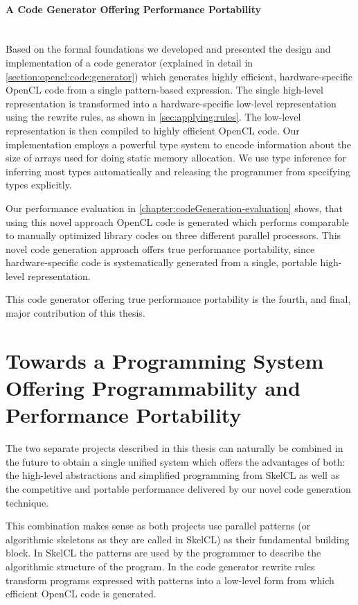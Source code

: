 \paragraph{A Code Generator Offering Performance Portability}\hfill\\
Based on the formal foundations we developed and presented the design and implementation of a code generator (explained in detail in \autoref{section:opencl:code:generator}) which generates highly efficient, hardware-specific OpenCL code from a single pattern-based expression.
The single high-level representation is transformed into a hardware-specific low-level representation using the rewrite rules, as shown in \autoref{sec:applying:rules}.
The low-level representation is then compiled to highly efficient OpenCL code.
Our implementation employs a powerful type system to encode information about the size of arrays used for doing static memory allocation.
We use type inference for inferring most types automatically and releasing the programmer from specifying types explicitly.

Our performance evaluation in \autoref{chapter:codeGeneration-evaluation} shows, that using this novel approach OpenCL code is generated which performs comparable to manually optimized library codes on three different parallel processors.
This novel code generation approach offers true performance portability, since hardware-specific code is systematically generated from a single, portable high-level representation.

\bigskip
This code generator offering true performance portability is the fourth, and final, major contribution of this thesis.


\section{Towards a Programming System Offering Programmability and Performance Portability}
\label{section:future-work}
The two separate projects described in this thesis can naturally be combined in the future to obtain a single unified system which offers the advantages of both:
the high-level abstractions and simplified programming from SkelCL as well as the competitive and portable performance delivered by our novel code generation technique.

This combination makes sense as both projects use parallel patterns (or algorithmic skeletons as they are called in SkelCL) as their fundamental building block.
In SkelCL the patterns are used by the programmer to describe the algorithmic structure of the program.
In the code generator rewrite rules transform programs expressed with patterns into a low-level form from which efficient OpenCL code is generated.

